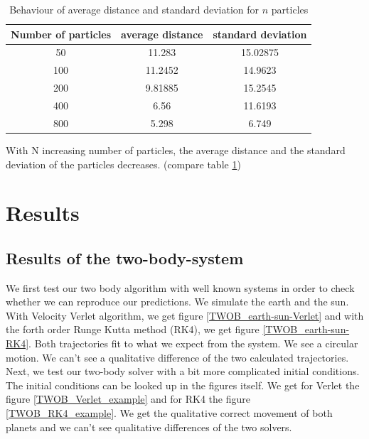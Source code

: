 \documentclass[10pt,a4paper]{article}
\begin{document}
\begin{table}[h]
\centering
\caption{Behaviour of average distance and standard deviation for $n$ particles \label{averagedistance}}
\begin{tabular}{c|c|c}
Number of particles & average distance&  standard deviation\\
\hline \hline
50 & 11.283 & 15.02875  \\
100 & 11.2452 & 14.9623  \\
200 & 9.81885 & 15.2545  \\
400 & 6.56 & 11.6193 \\
800 & 5.298 & 6.749 \\
\end{tabular}
\end{table}

With N increasing number of particles, the average distance and the standard deviation of the particles decreases. (compare table \ref{averagedistance})
 

\clearpage
\section{Results}

\subsection{Results of the two-body-system}

We first test our two body algorithm with well known systems in order to check whether we can reproduce our predictions. We simulate the earth and the sun. With Velocity Verlet algorithm, we get figure \ref{TWOB_earth-sun-Verlet} and with the forth order Runge Kutta method (RK4), we get figure \ref{TWOB_earth-sun-RK4}. Both trajectories fit to what we expect from the system. We see a circular motion. We can't see a qualitative difference of the two calculated trajectories. 
Next, we test our two-body solver with a bit more complicated initial conditions. The initial conditions can be looked up in the figures itself. We get for Verlet the figure \ref{TWOB_Verlet_example} and for RK4 the figure \ref{TWOB_RK4_example}. We get the qualitative correct movement of both planets and we can't see qualitative differences of the two solvers. 
\end{document}
